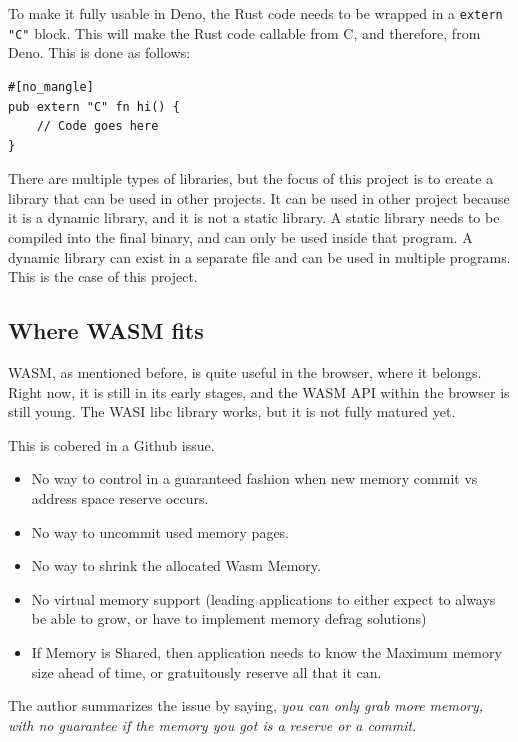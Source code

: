 \documentclass[12pt, letterpaper]{article}
\begin{document}
\begin{multicols}{2}
    To make it fully usable in Deno, the Rust code needs to be wrapped in a \verb|extern "C"| block. This will make the Rust code callable from C, and therefore, from Deno. This is done as follows:

    \begin{lstlisting}
#[no_mangle]
pub extern "C" fn hi() {
    // Code goes here
}
    \end{lstlisting}

    There are multiple types of libraries, but the focus of this project is to create a library that can be used in other projects. It can be used in other project because it is a dynamic library, and it is not a static library. A static library needs to be compiled into the final binary, and can only be used inside that program. A dynamic library can exist in a separate file and can be used in multiple programs. This is the case of this project.


    \subsection{Where WASM fits}

    WASM, as mentioned before, is quite useful in the browser, where it belongs. Right now, it is still in its early stages, and the WASM API within the browser is still young. The WASI libc library works, but it is not fully matured yet.

    This is cobered in a Github issue. \cite{WASMBAD}

    \begin{itemize}
        \item No way to control in a guaranteed fashion when new memory commit vs address space reserve occurs.
        \item No way to uncommit used memory pages.
        \item No way to shrink the allocated Wasm Memory.
        \item No virtual memory support (leading applications to either expect to always be able to grow, or have to implement memory defrag solutions)
        \item If Memory is Shared, then application needs to know the Maximum memory size ahead of time, or gratuitously reserve all that it can.
    \end{itemize}

    The author summarizes the issue by saying, \textit{you can only grab more memory, with no guarantee if the memory you got is a reserve or a commit}.


\end{multicols}
\end{document}
